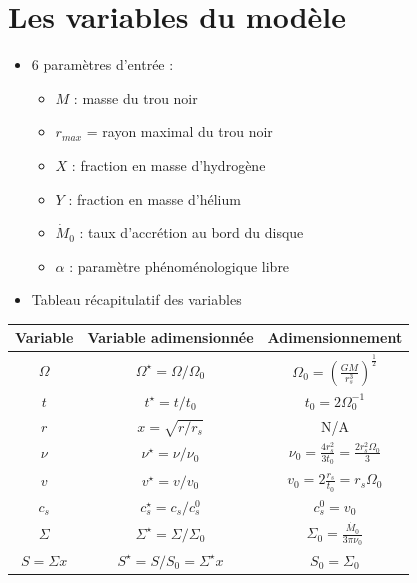 \documentclass[french]{beamer}
\begin{document}
\section{Les variables du modèle}
\begin{frame}
\begin{itemize}
	\item 6 paramètres d'entrée :
	\begin{itemize}
		\item $M$ : masse du trou noir
		\item $r_{max}$ = rayon maximal du trou noir
		\item $X$ : fraction en masse d'hydrogène
		\item $Y$ : fraction en masse d'hélium
		\item $\dot{M}_{0}$ : taux d'accrétion au bord du disque
		\item $\alpha$ : paramètre phénoménologique libre 
	\end{itemize}
\end{itemize}
\end{frame}

\begin{frame}
\begin{itemize}
	\item {Tableau récapitulatif des variables}
\end{itemize}

\begin{center}
    \begin{tabular}{|c|c|c|}
        \hline
        Variable & Variable adimensionnée & Adimensionnement \\
        \hline
        $\Omega$ & $\Omega^\star = \Omega/\Omega_0$ & $\Omega_0 = \left( \frac{G M}{r^3_s} \right)^\frac{1}{2}$ \\
        $t$ & $t^\star = t/t_0$ & $t_0 = 2 \Omega_0^{-1}$ \\
        $r$ & $x = \sqrt{r/r_s}$ & N/A \\
        $\nu$ & $\nu^\star = \nu/\nu_0$ & $\nu_0 = \frac{4 r_s^2}{3 t_0} = \frac{2 r_s^2 \Omega_0}{3}$ \\
        $v$ & $v^\star = v/v_0$ & $v_0 = 2 \frac{r_s}{t_0} = r_s \Omega_0$ \\
        $c_s$ & $c_s^\star = c_s/c_s^0$ & $c_s^0 = v_0$ \\
        $\Sigma$ & $\Sigma^\star = \Sigma/\Sigma_0$ & $\Sigma_0 = \frac{\dot{M_0}}{3 \pi \nu_0}$ \\
        $S = \Sigma x$ & $S^\star = S/S_0 = \Sigma^\star x$ & $S_0 = \Sigma_0$ \\
        \hline
    \end{tabular}
\end{center}

\end{frame}
\end{document}
